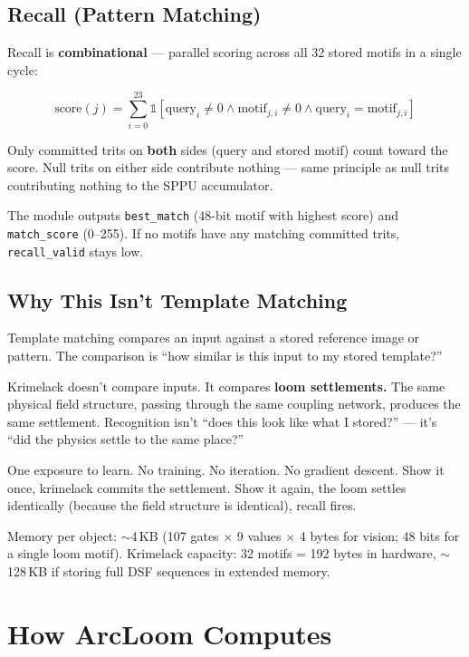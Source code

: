 \documentclass[11pt,a4paper]{article}
\begin{document}
\subsection{Recall (Pattern Matching)}

Recall is \textbf{combinational} --- parallel scoring across all 32 stored motifs in a single cycle:

\begin{equation}
\text{score}(j) = \sum_{i=0}^{23} \mathbb{1}\left[\text{query}_i \neq 0 \wedge \text{motif}_{j,i} \neq 0 \wedge \text{query}_i = \text{motif}_{j,i}\right]
\end{equation}

Only committed trits on \textbf{both} sides (query and stored motif) count toward the score. Null trits on either side contribute nothing --- same principle as null trits contributing nothing to the SPPU accumulator.

The module outputs \texttt{best\_match} (48-bit motif with highest score) and \texttt{match\_score} (0--255). If no motifs have any matching committed trits, \texttt{recall\_valid} stays low.

\subsection{Why This Isn't Template Matching}

Template matching compares an input against a stored reference image or pattern. The comparison is ``how similar is this input to my stored template?''

Krimelack doesn't compare inputs. It compares \textbf{loom settlements.} The same physical field structure, passing through the same coupling network, produces the same settlement. Recognition isn't ``does this look like what I stored?'' --- it's ``did the physics settle to the same place?''

One exposure to learn. No training. No iteration. No gradient descent. Show it once, krimelack commits the settlement. Show it again, the loom settles identically (because the field structure is identical), recall fires.

Memory per object: $\sim$4\,KB (107 gates $\times$ 9 values $\times$ 4 bytes for vision; 48 bits for a single loom motif). Krimelack capacity: 32 motifs = 192 bytes in hardware, $\sim$128\,KB if storing full DSF sequences in extended memory.

\section{How ArcLoom Computes}
\end{document}
